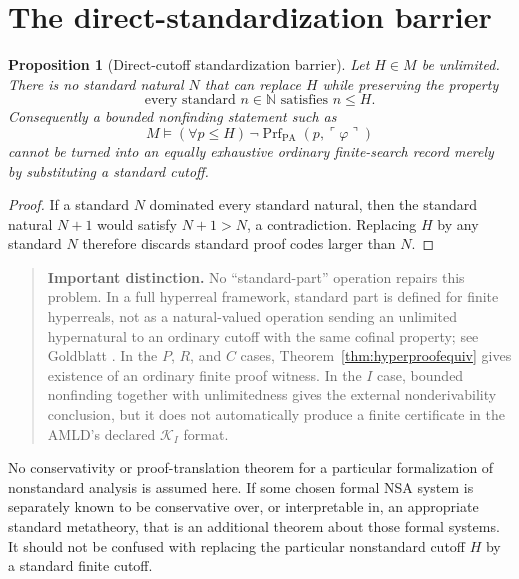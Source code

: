\documentclass[11pt,openany]{book}
\newtheorem{proposition}[theorem]{Proposition}
\theoremstyle{definition}
\theoremstyle{remark}
\newenvironment{warningbox}{\begin{quote}\small\color{red!50!black}\textbf{Important distinction.} }{\end{quote}}
\newcommand{\N}{\mathbb{N}}
\newcommand{\Prf}{\operatorname{Prf}}
\begin{document}
\section{The direct-standardization barrier}
\begin{proposition}[Direct-cutoff standardization barrier]\label{prop:standardbarrier}
Let \(H\in M\) be unlimited. There is no standard natural \(N\) that can replace \(H\) while preserving the property
\[
\text{every standard }n\in\N\text{ satisfies }n\le H.
\]
Consequently a bounded nonfinding statement such as
\[
M\models(\forall p\le H)\,\neg\Prf_{\mathrm{PA}}(p,\ulcorner\varphi\urcorner)
\]
cannot be turned into an equally exhaustive ordinary finite-search record merely by substituting a standard cutoff.
\end{proposition}
\begin{proof}
If a standard \(N\) dominated every standard natural, then the standard natural \(N+1\) would satisfy \(N+1>N\), a contradiction. Replacing \(H\) by any standard \(N\) therefore discards standard proof codes larger than \(N\).
\end{proof}

\begin{warningbox}
No ``standard-part'' operation repairs this problem. In a full hyperreal framework, standard part is defined for finite hyperreals, not as a natural-valued operation sending an unlimited hypernatural to an ordinary cutoff with the same cofinal property; see Goldblatt \cite{GoldblattHyperreals}. In the \(P\), \(R\), and \(C\) cases, Theorem~\ref{thm:hyperproofequiv} gives existence of an ordinary finite proof witness. In the \(I\) case, bounded nonfinding together with unlimitedness gives the external nonderivability conclusion, but it does not automatically produce a finite certificate in the AMLD's declared \(\mathcal K_I\) format.
\end{warningbox}

No conservativity or proof-translation theorem for a particular formalization of nonstandard analysis is assumed here. If some chosen formal NSA system is separately known to be conservative over, or interpretable in, an appropriate standard metatheory, that is an additional theorem about those formal systems. It should not be confused with replacing the particular nonstandard cutoff \(H\) by a standard finite cutoff.
\end{document}
